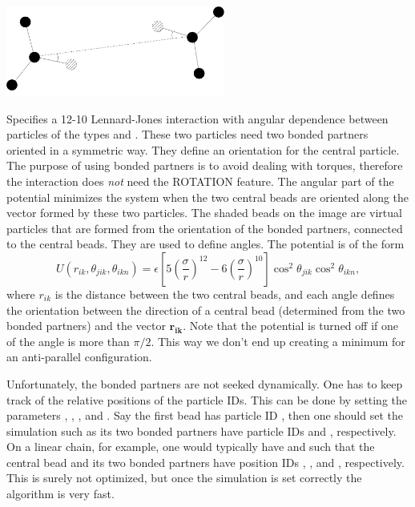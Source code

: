 \begin{center}
  \includegraphics[height=8em]{figures/hbond}
\end{center}

Specifies a 12-10 Lennard-Jones interaction with angular dependence between
particles of the types  and . These two particles need
two bonded partners oriented in a symmetric way. They define an orientation
for the central particle. The purpose of using bonded partners is to avoid
dealing with torques, therefore the interaction does \emph{not} need the
ROTATION feature. The angular part of the potential minimizes the system when
the two central beads are oriented along the vector formed by these two
particles. The shaded beads on the image are virtual particles that are formed
from the orientation of the bonded partners, connected to the central
beads. They are used to define angles. The potential is of the form
\begin{equation}
  U(r_{ik},\theta_{jik},\theta_{ikn})=
  \epsilon\left[5\left(\frac{\sigma}r\right)^{12} - 
    6\left(\frac{\sigma}{r}\right)^{10}\right]
  \cos^2\theta_{jik}\cos^2\theta_{ikn},
\end{equation}
where $r_{ik}$ is the distance between the two central beads, and each angle
defines the orientation between the direction of a central bead (determined
from the two bonded partners) and the vector $\mathbf{r_{ik}}$. Note that the
potential is turned off if one of the angle is more than $\pi/2$. This way we
don't end up creating a minimum for an anti-parallel configuration.

Unfortunately, the bonded partners are not seeked dynamically. One has to keep
track of the relative positions of the particle IDs. This can be done by
setting the parameters , , , and . Say
the first bead  has particle ID , then one should set the
simulation such as its two bonded partners have particle IDs  and
, respectively. On a linear chain, for example, one would
typically have  and  such that the central bead and
its two bonded partners have position IDs , , and ,
respectively. This is surely not optimized, but once the simulation is set
correctly the algorithm is very fast.

